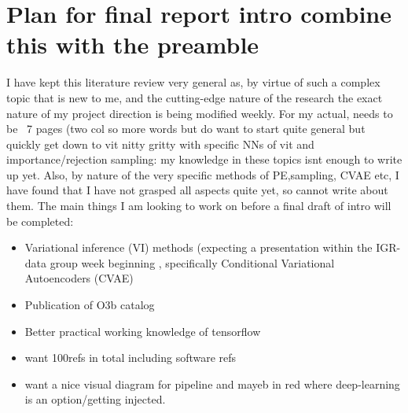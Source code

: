 \documentclass[11pt]{article}
\begin{document}
\section{Plan for final report intro combine this with the preamble}

I have kept this literature review very general as, by virtue of such a complex topic that is new to me, and the cutting-edge nature of the research the exact nature of my project direction is being modified weekly. For my actual, needs to be ~7 pages (two col so more words but do want to start quite general but quickly get down to vit nitty gritty with specific NNs of vit and importance/rejection sampling: my knowledge in these topics isnt enough to write up yet. Also, by nature of the very specific methods of PE,sampling, CVAE etc, I have found that I have not grasped all aspects quite yet, so cannot write about them. The main things I am looking to work on before a final draft of intro will be completed:
\begin{itemize}
  \item Variational inference (VI) methods (expecting a presentation within the IGR-data group week beginning , specifically Conditional Variational Autoencoders (CVAE)
  \item Publication of O3b catalog
  \item Better practical working knowledge of tensorflow~\cite{tensorflow}
  \item want 100refs in total including software refs
  \item want a nice visual diagram for pipeline and mayeb in red where deep-learning is an option/getting injected.
\end{itemize}
\end{document}
